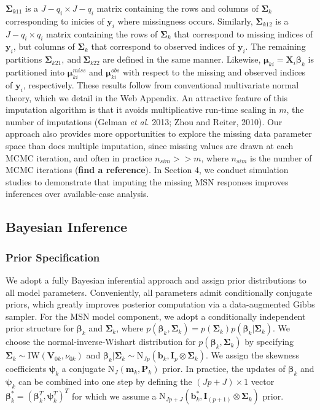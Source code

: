 \documentclass[useAMS,referee]{biom}
\begin{document}
$\boldsymbol\Sigma_{k11}$ is a $J-q_i \times J-q_i$ matrix containing the rows and columns of $\boldsymbol\Sigma_k$ corresponding to inicies of $\mathbf{y}_{i}$ where missingness occurs. Similarly, $\boldsymbol\Sigma_{k12}$ is a $J-q_i \times q_i$ matrix containing the rows of $\boldsymbol\Sigma_k$ that correspond to missing indices of $\mathbf{y}_i$, but columns of $\boldsymbol\Sigma_k$ that correspond to observed indices of $\mathbf{y}_i$. The remaining partitions $\boldsymbol\Sigma_{k21}, \ \text{and} \ \boldsymbol\Sigma_{k22}$ are defined in the same manner. Likewise, $\boldsymbol\mu_{ki} = \mathbf{X}_i \boldsymbol\beta_k$ is partitioned into $\boldsymbol\mu_{ki}^{miss}$ and $\boldsymbol\mu_{ki}^{obs}$ with respect to the missing and observed indices of $\mathbf{y}_i$, respectively. These results follow from conventional multivariate normal theory, which we detail in the Web Appendix. An attractive feature of this imputation algorithm is that it avoids multiplicative run-time scaling in $m$, the number of imputations (Gelman \textit{et al.} 2013; Zhou and Reiter, 2010). Our approach also provides more opportunities to explore the missing data parameter space than does multiple imputation, since missing values are drawn at each MCMC iteration, and often in practice $n_{sim} >> m$, where $n_{sim}$ is the number of MCMC iterations (\textbf{find a reference}). In Section 4, we conduct simulation studies to demonstrate that imputing the missing MSN responses improves inferences over available-case analysis.

\subsection{Bayesian Inference}

\subsubsection{Prior Specification}
We adopt a fully Bayesian inferential approach and assign prior distributions to all model parameters. Conveniently, all parameters admit conditionally conjugate priors, which greatly improves posterior computation via a data-augmented Gibbs sampler. For the MSN model component, we adopt a conditionally independent prior structure for $\boldsymbol\beta_k$ and $\boldsymbol\Sigma_k$, where $p(\boldsymbol\beta_k,\boldsymbol\Sigma_k) = p(\boldsymbol\Sigma_k)p(\boldsymbol\beta_k|\boldsymbol\Sigma_k)$. We choose the normal-inverse-Wishart distribution for $p(\boldsymbol\beta_k,\boldsymbol\Sigma_k)$ by specifying $\boldsymbol\Sigma_k \sim \text{IW}(\mathbf{V}_{0k},\nu_{0k})$ and $\boldsymbol\beta_k|\boldsymbol\Sigma_k \sim \text{N}_{Jp}(\mathbf{b}_k,\mathbf{I}_p \otimes \boldsymbol\Sigma_k)$. We assign the skewness coefficients $\boldsymbol\psi_k$ a conjugate $\text{N}_J(\mathbf{m}_k,\mathbf{P}_k)$ prior. In practice, the updates of $\boldsymbol\beta_k$ and $\boldsymbol\psi_k$ can be combined into one step by defining the $(Jp + J) \times 1$ vector $\boldsymbol\beta^*_k = (\boldsymbol\beta_k^T,\boldsymbol\psi_k^T)^T$ for which we assume a $\text{N}_{Jp+J}(\mathbf{b}^*_k,\mathbf{I}_{(p+1)} \otimes \boldsymbol\Sigma_k)$ prior. 
\end{document}
